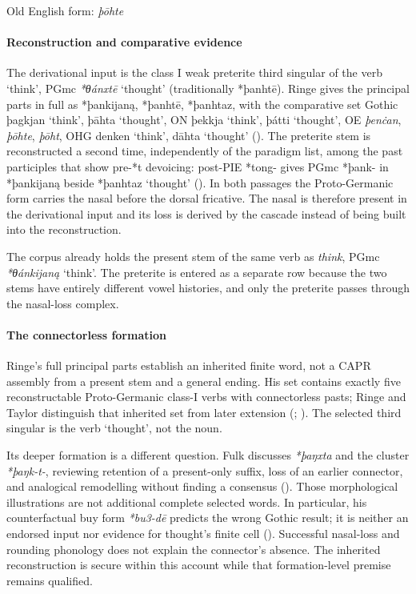\documentclass[
  british,
  a4paper,
]{article}
\providecommand{\Recon}[1]{\emph{*#1}}
\begin{document}
Old English form: \emph{þōhte}

\paragraph{Reconstruction and comparative
evidence}\label{reconstruction-and-comparative-evidence-66}

The derivational input is the class I weak preterite third singular of
the verb `think', PGmc \Recon{θánxtē} `thought' (traditionally *þanhtē).
Ringe gives the principal parts in full as *þankijaną, *þanhtē,
*þanhtaz, with the comparative set Gothic {þagkjan} `think', {þāhta}
`thought', ON {þekkja} `think', {þátti} `thought', OE \emph{þenċan},
\emph{þōhte}, \emph{þōht}, OHG {denken} `think', {dāhta} `thought'
(). The preterite stem is
reconstructed a second time, independently of the paradigm list, among
the past participles that show pre-*t devoicing: post-PIE *tong- gives
PGmc *þank- in *þankijaną beside *þanhtaz `thought'
(). In both passages the
Proto-Germanic form carries the nasal before the dorsal fricative. The
nasal is therefore present in the derivational input and its loss is
derived by the cascade instead of being built into the reconstruction.

The corpus already holds the present stem of the same verb as
\emph{think}, PGmc \Recon{θánkijaną} `think'. The preterite is entered
as a separate row because the two stems have entirely different vowel
histories, and only the preterite passes through the nasal-loss complex.

\paragraph{The connectorless
formation}\label{the-connectorless-formation}

Ringe's full principal parts establish an inherited finite word, not a
CAPR assembly from a present stem and a general ending. His set contains
exactly five reconstructable Proto-Germanic class-I verbs with
connectorless pasts; Ringe and Taylor distinguish that inherited set
from later extension (;
).
The selected third singular is the verb `thought', not the noun.

Its deeper formation is a different question. Fulk discusses
\emph{*þaŋxta} and the cluster \emph{*þaŋk-t-}, reviewing retention of a
present-only suffix, loss of an earlier connector, and analogical
remodelling without finding a consensus (). Those morphological illustrations are not additional
complete selected words. In particular, his counterfactual buy form
\emph{*bu3-dē} predicts the wrong Gothic result; it is neither an
endorsed input nor evidence for thought's finite cell
(). Successful nasal-loss and
rounding phonology does not explain the connector's absence. The
inherited reconstruction is secure within this account while that
formation-level premise remains qualified.
\end{document}
